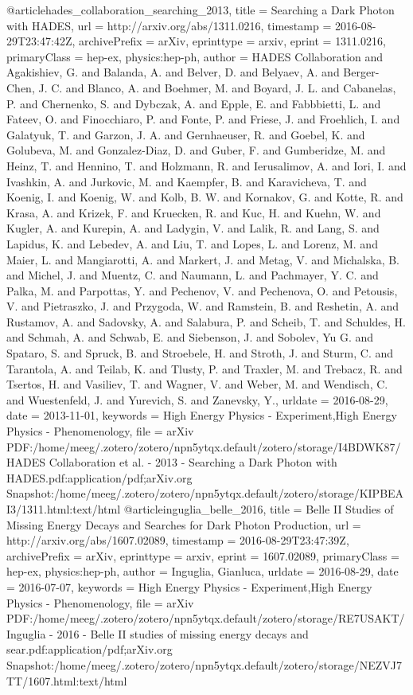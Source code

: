 @article{hades_collaboration_searching_2013,
  title = {Searching a {{Dark Photon}} with {{HADES}}},
  url = {http://arxiv.org/abs/1311.0216},
  timestamp = {2016-08-29T23:47:42Z},
  archivePrefix = {arXiv},
  eprinttype = {arxiv},
  eprint = {1311.0216},
  primaryClass = {hep-ex, physics:hep-ph},
  author = {HADES Collaboration and Agakishiev, G. and Balanda, A. and Belver, D. and Belyaev, A. and Berger-Chen, J. C. and Blanco, A. and Boehmer, M. and Boyard, J. L. and Cabanelas, P. and Chernenko, S. and Dybczak, A. and Epple, E. and Fabbbietti, L. and Fateev, O. and Finocchiaro, P. and Fonte, P. and Friese, J. and Froehlich, I. and Galatyuk, T. and Garzon, J. A. and Gernhaeuser, R. and Goebel, K. and Golubeva, M. and Gonzalez-Diaz, D. and Guber, F. and Gumberidze, M. and Heinz, T. and Hennino, T. and Holzmann, R. and Ierusalimov, A. and Iori, I. and Ivashkin, A. and Jurkovic, M. and Kaempfer, B. and Karavicheva, T. and Koenig, I. and Koenig, W. and Kolb, B. W. and Kornakov, G. and Kotte, R. and Krasa, A. and Krizek, F. and Kruecken, R. and Kuc, H. and Kuehn, W. and Kugler, A. and Kurepin, A. and Ladygin, V. and Lalik, R. and Lang, S. and Lapidus, K. and Lebedev, A. and Liu, T. and Lopes, L. and Lorenz, M. and Maier, L. and Mangiarotti, A. and Markert, J. and Metag, V. and Michalska, B. and Michel, J. and Muentz, C. and Naumann, L. and Pachmayer, Y. C. and Palka, M. and Parpottas, Y. and Pechenov, V. and Pechenova, O. and Petousis, V. and Pietraszko, J. and Przygoda, W. and Ramstein, B. and Reshetin, A. and Rustamov, A. and Sadovsky, A. and Salabura, P. and Scheib, T. and Schuldes, H. and Schmah, A. and Schwab, E. and Siebenson, J. and Sobolev, Yu G. and Spataro, S. and Spruck, B. and Stroebele, H. and Stroth, J. and Sturm, C. and Tarantola, A. and Teilab, K. and Tlusty, P. and Traxler, M. and Trebacz, R. and Tsertos, H. and Vasiliev, T. and Wagner, V. and Weber, M. and Wendisch, C. and Wuestenfeld, J. and Yurevich, S. and Zanevsky, Y.},
  urldate = {2016-08-29},
  date = {2013-11-01},
  keywords = {High Energy Physics - Experiment,High Energy Physics - Phenomenology},
  file = {arXiv PDF:/home/meeg/.zotero/zotero/npn5ytqx.default/zotero/storage/I4BDWK87/HADES Collaboration et al. - 2013 - Searching a Dark Photon with HADES.pdf:application/pdf;arXiv.org Snapshot:/home/meeg/.zotero/zotero/npn5ytqx.default/zotero/storage/KIPBEAI3/1311.html:text/html}
}
@article{inguglia_belle_2016,
  title = {Belle {{II}} Studies of Missing Energy Decays and Searches for Dark Photon Production},
  url = {http://arxiv.org/abs/1607.02089},
  timestamp = {2016-08-29T23:47:39Z},
  archivePrefix = {arXiv},
  eprinttype = {arxiv},
  eprint = {1607.02089},
  primaryClass = {hep-ex, physics:hep-ph},
  author = {Inguglia, Gianluca},
  urldate = {2016-08-29},
  date = {2016-07-07},
  keywords = {High Energy Physics - Experiment,High Energy Physics - Phenomenology},
  file = {arXiv PDF:/home/meeg/.zotero/zotero/npn5ytqx.default/zotero/storage/RE7USAKT/Inguglia - 2016 - Belle II studies of missing energy decays and sear.pdf:application/pdf;arXiv.org Snapshot:/home/meeg/.zotero/zotero/npn5ytqx.default/zotero/storage/NEZVJ7TT/1607.html:text/html}
}
